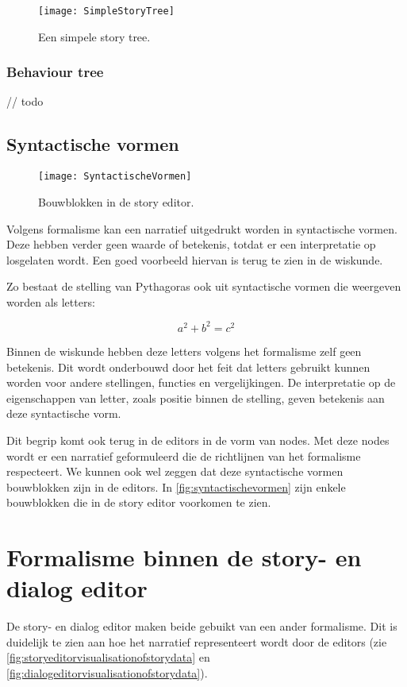 \begin{figure}[H]
    \centering    
    \texttt{[image: SimpleStoryTree]}
    \caption[]{Een simpele story tree. \footnotemark}
    \label{fig:simplestorytree}
\end{figure}

\subsubsection{Behaviour tree}
// todo

\subsection{Syntactische vormen}

\begin{wrapfigure}{r}{0.4\textwidth}
    \centering    
    \texttt{[image: SyntactischeVormen]}
    \caption{Bouwblokken in de story editor.}
    \label{fig:syntactischevormen}
\end{wrapfigure}

Volgens formalisme kan een narratief uitgedrukt worden in syntactische vormen. Deze hebben verder geen waarde of betekenis, totdat er een interpretatie op losgelaten wordt. Een goed voorbeeld hiervan is terug te zien in de wiskunde. 

Zo bestaat de stelling van Pythagoras ook uit syntactische vormen die weergeven worden als letters:

\[ a^2 + b^2 = c^2 \]

Binnen de wiskunde hebben deze letters volgens het formalisme zelf geen betekenis. Dit wordt onderbouwd door het feit dat letters gebruikt kunnen worden voor andere stellingen, functies en vergelijkingen. De interpretatie op de eigenschappen van letter, zoals positie binnen de stelling, geven betekenis aan deze syntactische vorm.

Dit begrip komt ook terug in de editors in de vorm van nodes. Met deze nodes wordt er een narratief geformuleerd die de richtlijnen van het formalisme respecteert. We kunnen ook wel zeggen dat deze syntactische vormen bouwblokken zijn in de editors. In \autoref{fig:syntactischevormen} zijn enkele bouwblokken die in de story editor voorkomen te zien.

\section{Formalisme binnen de story- en dialog editor}
De story- en dialog editor maken beide gebuikt van een ander formalisme. Dit is duidelijk te zien aan hoe het narratief representeert wordt door de editors (zie \autoref{fig:storyeditorvisualisationofstorydata} en \autoref{fig:dialogeditorvisualisationofstorydata}). 

